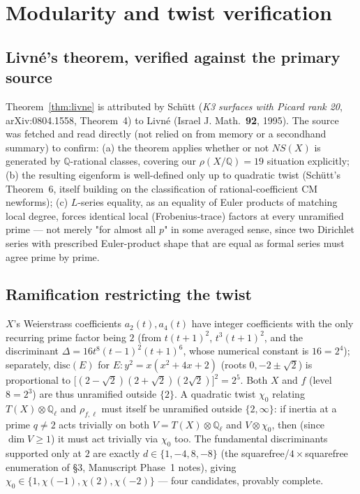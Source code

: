 \documentclass[11pt]{amsart}
\theoremstyle{definition}
\newcommand{\Q}{\mathbb{Q}}
\begin{document}
\section{Modularity and twist verification}
\label{app:twist}

\subsection*{Livn\'e's theorem, verified against the primary source}

Theorem~\ref{thm:livne} is attributed by Schütt (\emph{K3 surfaces with Picard rank 20}, arXiv:0804.1558, Theorem~4) to Livné (Israel J. Math.\ \textbf{92}, 1995). The source was fetched and read directly (not relied on from memory or a secondhand summary) to confirm: (a) the theorem applies whether or not $NS(X)$ is generated by $\Q$-rational classes, covering our $\rho(X/\Q)=19$ situation explicitly; (b) the resulting eigenform is well-defined only up to quadratic twist (Schütt's Theorem~6, itself building on the classification of rational-coefficient CM newforms); (c) $L$-series equality, as an equality of Euler products of matching local degree, forces identical local (Frobenius-trace) factors at every unramified prime — not merely "for almost all $p$" in some averaged sense, since two Dirichlet series with prescribed Euler-product shape that are equal as formal series must agree prime by prime.

\subsection*{Ramification restricting the twist}

$X$'s Weierstrass coefficients $a_2(t),a_4(t)$ have integer coefficients with the only recurring prime factor being $2$ (from $t(t+1)^2$, $t^3(t+1)^2$, and the discriminant $\Delta=16t^8(t-1)^2(t+1)^6$, whose numerical constant is $16=2^4$); separately, $\mathrm{disc}(E)$ for $E:y^2=x(x^2+4x+2)$ (roots $0,-2\pm\sqrt2$) is proportional to $\bigl[(2-\sqrt2)(2+\sqrt2)(2\sqrt2)\bigr]^2=2^5$. Both $X$ and $f$ (level $8=2^3$) are thus unramified outside $\{2\}$. A quadratic twist $\chi_0$ relating $T(X)\otimes\Q_\ell$ and $\rho_{f,\ell}$ must itself be unramified outside $\{2,\infty\}$: if inertia at a prime $q\ne2$ acts trivially on both $V=T(X)\otimes\Q_\ell$ and $V\otimes\chi_0$, then (since $\dim V\ge1$) it must act trivially via $\chi_0$ too. The fundamental discriminants supported only at $2$ are exactly $d\in\{1,-4,8,-8\}$ (the squarefree/$4\times$squarefree enumeration of \S3, Manuscript Phase~1 notes), giving $\chi_0\in\{1,\chi(-1),\chi(2),\chi(-2)\}$ — four candidates, provably complete.
\end{document}
